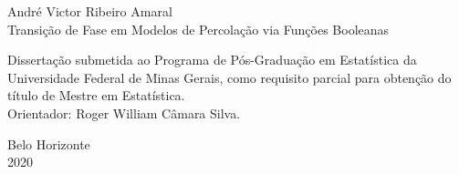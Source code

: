 \newpage

\begin{center}
	{\Large André Victor Ribeiro Amaral} \\ \vspace{7.5cm}
	{\LARGE Transição de Fase em Modelos de Percolação via Funções Booleanas} \\ \vspace{3.2cm}
	\begin{adjustwidth}{8cm}{0cm}
		{\normalsize Dissertação submetida ao Programa de Pós-Graduação em Estatística da Universidade Federal de Minas Gerais, como requisito parcial para obtenção do título de Mestre em Estatística. \\
		Orientador: Roger William Câmara Silva.}
	\end{adjustwidth} \vspace{5.7cm}
	{\normalsize Belo Horizonte} \\
	{\normalsize 2020}
\end{center}

\thispagestyle{empty}